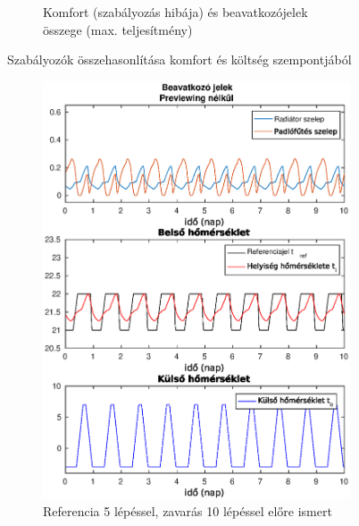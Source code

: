 \documentclass[14pt,handout]{beamer}
\begin{document}
\begin{frame}
\begin{figure}[H]
\begin{subfigure}[t]{0.47\textwidth}
		\caption{Komfort (szabályozás hibája) és beavatkozójelek összege (max. teljesítmény)}
		\label{fig:mpc-PeakDemand}
	\end{subfigure}
	\label{fig:mpcComfortCost}
	\caption{Szabályozók összehasonlítása komfort és költség szempontjából}
\end{figure}
\end{frame}


\begin{frame}
\begin{figure}[H]
	\begin{subfigure}[t]{0.47\textwidth}
		\centering
		\includegraphics[trim=0 0 0 0, clip,width=\textwidth]{figures/onlab/compare/A_C_P5D10}
		\caption{Referencia 5 lépéssel, zavarás 10 lépéssel előre ismert}
		\label{fig:mpc-c-p5d10}
	\end{subfigure}
	~
	\begin{subfigure}[t]{0.47\textwidth}
		\centering

\end{subfigure}
\end{figure}
\end{frame}
\end{document}
